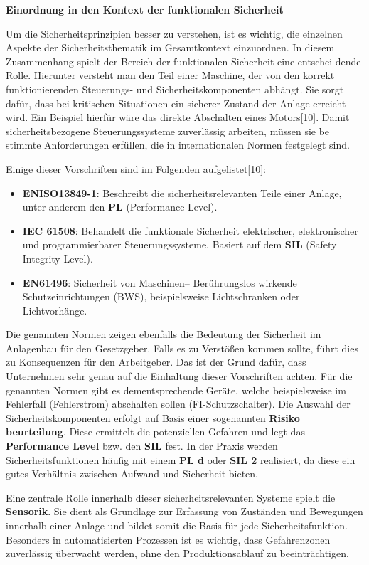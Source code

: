 \textbf{Einordnung in den Kontext der funktionalen Sicherheit}

Um die Sicherheitsprinzipien besser zu verstehen, ist es wichtig, die einzelnen Aspekte
der Sicherheitsthematik im Gesamtkontext einzuordnen.
In diesem Zusammenhang spielt der Bereich der funktionalen Sicherheit eine entschei
dende Rolle.
Hierunter versteht man den Teil einer Maschine, der von den korrekt funktionierenden
Steuerungs- und Sicherheitskomponenten abhängt. Sie sorgt dafür, dass bei kritischen
Situationen ein sicherer Zustand der Anlage erreicht wird. Ein Beispiel hierfür wäre das
direkte Abschalten eines Motors[10].
Damit sicherheitsbezogene Steuerungssysteme zuverlässig arbeiten, müssen sie be
stimmte Anforderungen erfüllen, die in internationalen Normen festgelegt sind.


Einige dieser Vorschriften sind im Folgenden aufgelistet[10]:

\begin{itemize}
    \item \textbf{ENISO13849-1}: Beschreibt die sicherheitsrelevanten Teile einer Anlage, unter anderem den \textbf{PL} (Performance Level).
    \item \textbf{IEC 61508}: Behandelt die funktionale Sicherheit elektrischer, elektronischer und programmierbarer Steuerungssysteme. Basiert auf dem \textbf{SIL} (Safety Integrity Level).
    \item \textbf{EN61496}: Sicherheit von Maschinen– Berührungslos wirkende Schutzeinrichtungen (BWS), beispielsweise Lichtschranken oder Lichtvorhänge.
\end{itemize}

Die genannten Normen zeigen ebenfalls die Bedeutung der Sicherheit im Anlagenbau
für den Gesetzgeber. Falls es zu Verstößen kommen sollte, führt dies zu Konsequenzen
für den Arbeitgeber.
Das ist der Grund dafür, dass Unternehmen sehr genau auf die Einhaltung dieser
Vorschriften achten.
Für die genannten Normen gibt es dementsprechende Geräte, welche beispielsweise
im Fehlerfall (Fehlerstrom) abschalten sollen (FI-Schutzschalter).
Die Auswahl der Sicherheitskomponenten erfolgt auf Basis einer sogenannten \textbf{Risiko
beurteilung}. Diese ermittelt die potenziellen Gefahren und legt das \textbf{Performance Level}
bzw. den \textbf{SIL} fest. In der Praxis werden Sicherheitsfunktionen häufig mit einem \textbf{PL d}
oder \textbf{SIL 2} realisiert, da diese ein gutes Verhältnis zwischen Aufwand und Sicherheit
bieten.


Eine zentrale Rolle innerhalb dieser sicherheitsrelevanten Systeme spielt die \textbf{Sensorik}.
Sie dient als Grundlage zur Erfassung von Zuständen und Bewegungen innerhalb einer
Anlage und bildet somit die Basis für jede Sicherheitsfunktion.
Besonders in automatisierten Prozessen ist es wichtig, dass Gefahrenzonen zuverlässig
überwacht werden, ohne den Produktionsablauf zu beeinträchtigen.


